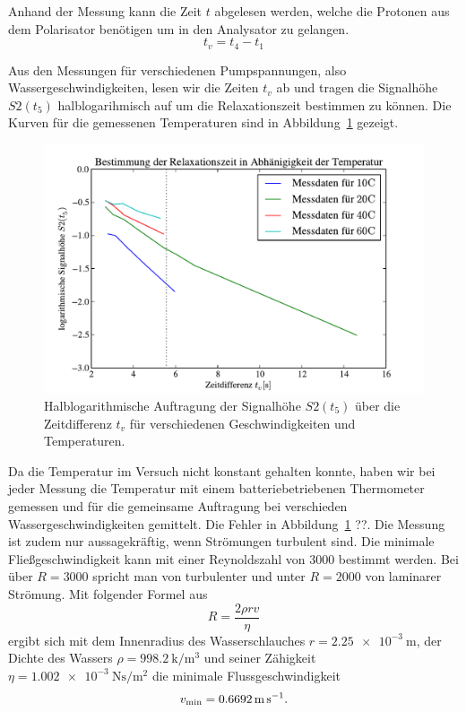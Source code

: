 \documentclass[paper=a4,
	fontsize=10pt,
	DIV=18,
	twocolumn,
	parskip=half
	]{scrartcl}
\numberwithin{equation}{section}    %
\newcommand{\note}[1]{{\color{red}#1??}}
\begin{document}
Anhand der Messung kann die Zeit $t$ abgelesen werden, welche die Protonen aus dem Polarisator benötigen um in den Analysator zu gelangen.
\begin{equation}
	t_v = t_4 - t_1
\end{equation}

Aus den Messungen für verschiedenen Pumpspannungen, also Wassergeschwindigkeiten, lesen wir die Zeiten $t_v$ ab und tragen die Signalhöhe $S2(t_5)$ halblogarihmisch auf um die Relaxationszeit bestimmen zu können. Die Kurven für die gemessenen Temperaturen sind in Abbildung~\ref{fig.relaxation} gezeigt.

\begin{figure}[htp]
	\begin{center}
		\includegraphics[width=\columnwidth]{Data-Plots/06-relaxation.pdf}
		\caption{Halblogarithmische Auftragung der Signalhöhe $S2(t_5)$ über die Zeitdifferenz $t_v$ für verschiedenen Geschwindigkeiten und Temperaturen.}
		\label{fig.relaxation}
	\end{center}
\end{figure}

Da die Temperatur im Versuch nicht konstant gehalten konnte, haben wir bei jeder Messung die Temperatur mit einem batteriebetriebenen Thermometer gemessen und für die gemeinsame Auftragung bei verschieden Wassergeschwindigkeiten gemittelt. Die Fehler in Abbildung~\ref{fig.relaxation} \note{}.
Die Messung ist zudem nur aussagekräftig, wenn Strömungen turbulent sind. Die minimale Fließgeschwindigkeit kann mit einer Reynoldszahl von 3000 bestimmt werden. Bei über $R = 3000$ spricht man von turbulenter und unter $R=2000$ von laminarer Strömung. Mit folgender Formel aus~\citet{anleitung}
\begin{equation}
	R=\frac{2\rho rv}{\eta}
\end{equation}
ergibt sich mit dem Innenradius des Wasserschlauches $r=\SI{2.25e-3}{\meter}$, der Dichte des Wassers $\rho=\SI{998.2}{\kilo\per\meter^3}$ und seiner Zähigkeit $\eta = \SI{1.002e-3}{\newton\second\per\meter\squared}$ die minimale Flussgeschwindigkeit
\begin{equation}
	v_{\rm min} = \SI{0.6692}{\meter\per\second}.
	\label{eq.vmin}
\end{equation}
\end{document}
